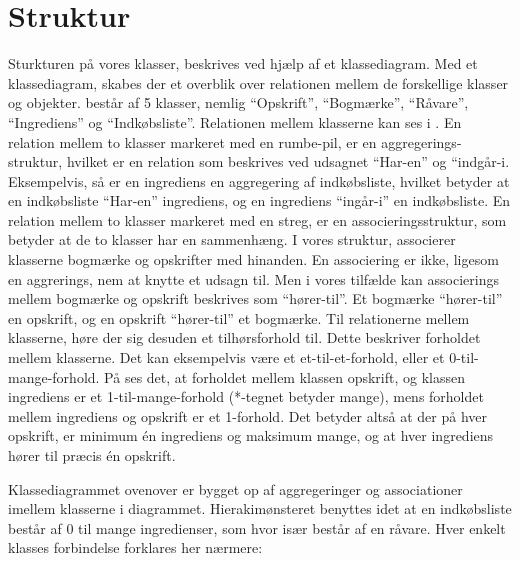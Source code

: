 \section{Struktur}
\label{sec:struktur}

Sturkturen på vores klasser, beskrives ved hjælp af et klassediagram. Med et klassediagram, skabes der et overblik over relationen mellem de forskellige klasser og objekter. \foodl består af 5 klasser, nemlig ``Opskrift'', ``Bogmærke'', ``Råvare'', ``Ingrediens'' og ``Indkøbsliste''. Relationen mellem klasserne kan ses i . En relation mellem to klasser markeret med en rumbe-pil, er en aggregerings-struktur, hvilket er en relation som beskrives ved udsagnet ``Har-en'' og ``indgår-i. Eksempelvis, så er en ingrediens en aggregering af indkøbsliste, hvilket betyder at en indkøbsliste ``Har-en'' ingrediens, og en ingrediens ``ingår-i'' en indkøbsliste. En relation mellem to klasser markeret med en streg, er en associeringsstruktur, som betyder at de to klasser har en sammenhæng. I vores struktur, associerer klasserne bogmærke og opskrifter med hinanden. En associering er ikke, ligesom en aggrerings, nem at knytte et udsagn til. Men i vores tilfælde kan associerings mellem bogmærke og opskrift beskrives som ``hører-til''. Et bogmærke ``hører-til'' en opskrift, og en opskrift ``hører-til'' et bogmærke. Til relationerne mellem klasserne, høre der sig desuden et tilhørsforhold til. Dette beskriver forholdet mellem klasserne. Det kan eksempelvis være et et-til-et-forhold, eller et 0-til-mange-forhold. På  ses det, at forholdet mellem klassen opskrift, og klassen ingrediens er et 1-til-mange-forhold (*-tegnet betyder mange), mens forholdet mellem ingrediens og opskrift er et 1-forhold. Det betyder altså at der på hver opskrift, er minimum én ingrediens og maksimum mange, og at hver ingrediens hører til præcis én opskrift.     



Klassediagrammet ovenover er bygget op af aggregeringer og associationer imellem klasserne i diagrammet. Hierakimønsteret benyttes idet at en indkøbsliste består af 0 til mange ingredienser, som hvor især består af en råvare. Hver enkelt klasses forbindelse forklares her nærmere:

